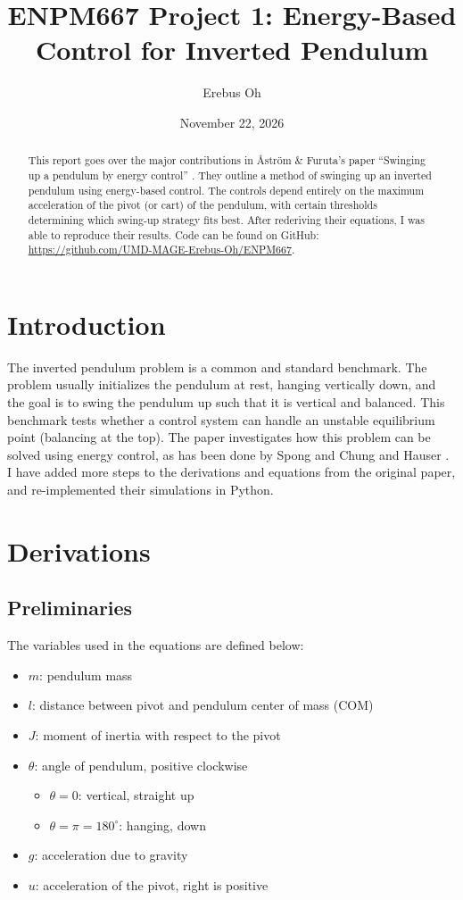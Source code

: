 \documentclass{article}
\title{ENPM667 Project 1: Energy-Based Control for Inverted Pendulum}
\author{Erebus Oh}
\date{November 22, 2026}
\begin{document}
\maketitle

\begin{abstract}
    This report goes over the major contributions in Åström \& Furuta's paper ``Swinging up a pendulum by energy control'' \cite{ASTROM2000287}. They outline a method of swinging up an inverted pendulum using energy-based control. The controls depend entirely on the maximum acceleration of the pivot (or cart) of the pendulum, with certain thresholds determining which swing-up strategy fits best. After rederiving their equations, I was able to reproduce their results. Code can be found on GitHub: \url{https://github.com/UMD-MAGE-Erebus-Oh/ENPM667}.
\end{abstract}

\section{Introduction}
The inverted pendulum problem is a common and standard benchmark. The problem usually initializes the pendulum at rest, hanging vertically down, and the goal is to swing the pendulum up such that it is vertical and balanced. This benchmark tests whether a control system can handle an unstable equilibrium point (balancing at the top). The paper investigates how this problem can be solved using energy control, as has been done by Spong \cite{Spong1996EnergyBC} and Chung and Hauser \cite{CHUNG1995851}. I have added more steps to the derivations and equations from the original paper, and re-implemented their simulations in Python.

\section{Derivations}
\subsection{Preliminaries}
The variables used in the equations are defined below:
\begin{itemize}
    \item $m$: pendulum mass
    \item $l$: distance between pivot and pendulum center of mass (COM)
    \item $J$: moment of inertia with respect to the pivot
    \item $\theta$: angle of pendulum, positive clockwise
    \begin{itemize}
        \item $\theta = 0$: vertical, straight up
        \item $\theta = \pi = 180^\circ$: hanging, down
    \end{itemize}
    \item $g$: acceleration due to gravity
    \item $u$: acceleration of the pivot, right is positive
\end{itemize}
\end{document}
